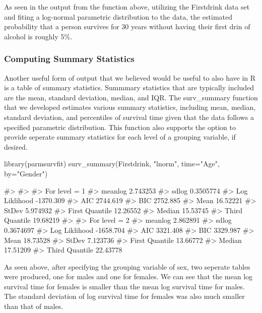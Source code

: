 As seen in the output from the function above, utilizing the Firstdrink
data set and fiting a log-normal parametric distribution to the data,
the estimated probability that a person survives for 30 years without
having their first drin of alcohol is roughly 5\%.

\hypertarget{computing-summary-statistics}{%
\subsubsection{Computing Summary
Statistics}\label{computing-summary-statistics}}

Another useful form of output that we believed would be useful to also
have in R is a table of summary statistics. Summmary statistics that are
typically included are the mean, standard deviation, median, and IQR.
The surv\_summary function that we developed estimates various summary
statistics, including mean, median, standard deviation, and percentiles
of survival time given that the data follows a specified parametric
distribution. This function also supports the option to provide seperate
summary statistics for each level of a grouping variable, if desired.

\begin{Schunk}
\begin{Sinput}
library(parmsurvfit)
surv_summary(Firstdrink, "lnorm", time="Age", by="Gender")
\end{Sinput}
\begin{Soutput}
#> 
#> 
#> For level = 1 
#> meanlog      2.743253
#> sdlog        0.3505774
#> Log Liklihood    -1370.309
#> AIC      2744.619
#> BIC      2752.885
#> Mean     16.52221
#> StDev        5.974932
#> First Quantile   12.26552
#> Median       15.53745
#> Third Quantile   19.68219
#> 
#> For level = 2 
#> meanlog      2.862891
#> sdlog        0.3674697
#> Log Liklihood    -1658.704
#> AIC      3321.408
#> BIC      3329.987
#> Mean     18.73528
#> StDev        7.123736
#> First Quantile   13.66772
#> Median       17.51209
#> Third Quantile   22.43778
\end{Soutput}
\end{Schunk}

As seen above, after specifying the grouping variable of sex, two
seperate tables were produced, one for males and one for females. We can
see that the mean log survival time for females is smaller than the mean
log survival time for males. The standard deviation of log survival time
for females was also much smaller than that of males.

